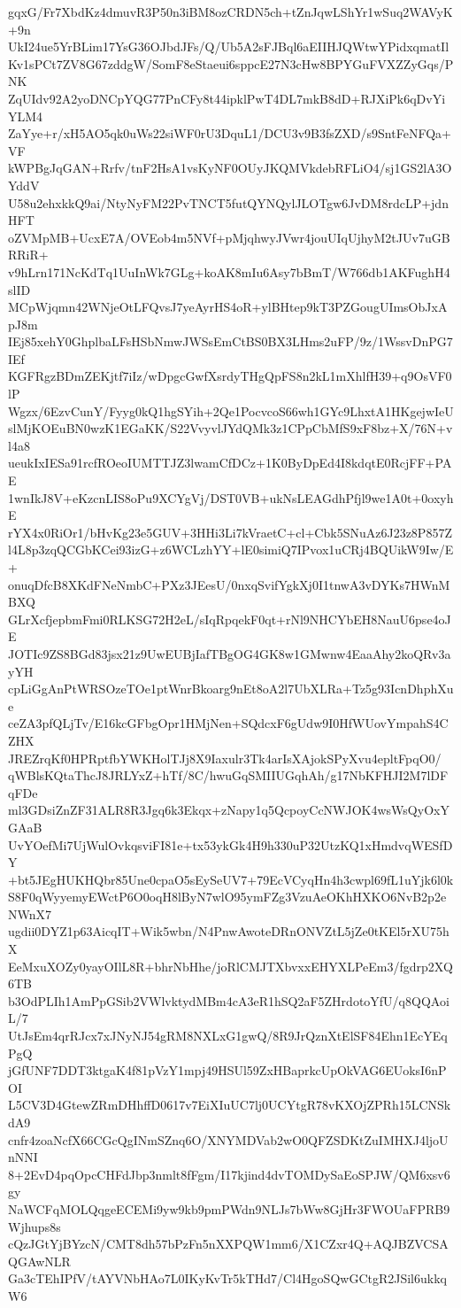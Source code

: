 gqxG/Fr7XbdKz4dmuvR3P50n3iBM8ozCRDN5ch+tZnJqwLShYr1wSuq2WAVyK+9n
UkI24ue5YrBLim17YsG36OJbdJFs/Q/Ub5A2sFJBql6aEIIHJQWtwYPidxqmatIl
Kv1sPCt7ZV8G67zddgW/SomF8eStaeui6sppcE27N3cHw8BPYGuFVXZZyGqs/PNK
ZqUIdv92A2yoDNCpYQG77PnCFy8t44ipklPwT4DL7mkB8dD+RJXiPk6qDvYiYLM4
ZaYye+r/xH5AO5qk0uWs22siWF0rU3DquL1/DCU3v9B3fsZXD/s9SntFeNFQa+VF
kWPBgJqGAN+Rrfv/tnF2HsA1vsKyNF0OUyJKQMVkdebRFLiO4/sj1GS2lA3OYddV
U58u2ehxkkQ9ai/NtyNyFM22PvTNCT5futQYNQylJLOTgw6JvDM8rdcLP+jdnHFT
oZVMpMB+UcxE7A/OVEob4m5NVf+pMjqhwyJVwr4jouUIqUjhyM2tJUv7uGBRRiR+
v9hLrn171NcKdTq1UuInWk7GLg+koAK8mIu6Asy7bBmT/W766db1AKFughH4slID
MCpWjqmn42WNjeOtLFQvsJ7yeAyrHS4oR+ylBHtep9kT3PZGougUImsObJxApJ8m
IEj85xehY0GhplbaLFsHSbNmwJWSsEmCtBS0BX3LHms2uFP/9z/1WssvDnPG7IEf
KGFRgzBDmZEKjtf7iIz/wDpgcGwfXsrdyTHgQpFS8n2kL1mXhlfH39+q9OsVF0lP
Wgzx/6EzvCunY/Fyyg0kQ1hgSYih+2Qe1PocvcoS66wh1GYc9LhxtA1HKgejwIeU
slMjKOEuBN0wzK1EGaKK/S22VvyvlJYdQMk3z1CPpCbMfS9xF8bz+X/76N+vl4a8
ueukIxIESa91rcfROeoIUMTTJZ3lwamCfDCz+1K0ByDpEd4I8kdqtE0RcjFF+PAE
1wnIkJ8V+eKzcnLIS8oPu9XCYgVj/DST0VB+ukNsLEAGdhPfjl9we1A0t+0oxyhE
rYX4x0RiOr1/bHvKg23e5GUV+3HHi3Li7kVraetC+cl+Cbk5SNuAz6J23z8P857Z
l4L8p3zqQCGbKCei93izG+z6WCLzhYY+lE0simiQ7IPvox1uCRj4BQUikW9Iw/E+
onuqDfcB8XKdFNeNmbC+PXz3JEesU/0nxqSvifYgkXj0I1tnwA3vDYKs7HWnMBXQ
GLrXcfjepbmFmi0RLKSG72H2eL/sIqRpqekF0qt+rNl9NHCYbEH8NauU6pse4oJE
JOTIc9ZS8BGd83jsx21z9UwEUBjIafTBgOG4GK8w1GMwnw4EaaAhy2koQRv3ayYH
cpLiGgAnPtWRSOzeTOe1ptWnrBkoarg9nEt8oA2l7UbXLRa+Tz5g93IcnDhphXue
ceZA3pfQLjTv/E16kcGFbgOpr1HMjNen+SQdcxF6gUdw9I0HfWUovYmpahS4CZHX
JREZrqKf0HPRptfbYWKHolTJj8X9Iaxulr3Tk4arIsXAjokSPyXvu4epltFpqO0/
qWBlsKQtaThcJ8JRLYxZ+hTf/8C/hwuGqSMIIUGqhAh/g17NbKFHJI2M7lDFqFDe
ml3GDsiZnZF31ALR8R3Jgq6k3Ekqx+zNapy1q5QcpoyCcNWJOK4wsWsQyOxYGAaB
UvYOefMi7UjWulOvkqsviFI81e+tx53ykGk4H9h330uP32UtzKQ1xHmdvqWESfDY
+bt5JEgHUKHQbr85Une0cpaO5sEySeUV7+79EcVCyqHn4h3cwpl69fL1uYjk6l0k
S8F0qWyyemyEWctP6O0oqH8lByN7wlO95ymFZg3VzuAeOKhHXKO6NvB2p2eNWnX7
ugdii0DYZ1p63AicqIT+Wik5wbn/N4PnwAwoteDRnONVZtL5jZe0tKEl5rXU75hX
EeMxuXOZy0yayOIlL8R+bhrNbHhe/joRlCMJTXbvxxEHYXLPeEm3/fgdrp2XQ6TB
b3OdPLIh1AmPpGSib2VWlvktydMBm4cA3eR1hSQ2aF5ZHrdotoYfU/q8QQAoiL/7
UtJsEm4qrRJcx7xJNyNJ54gRM8NXLxG1gwQ/8R9JrQznXtElSF84Ehn1EcYEqPgQ
jGfUNF7DDT3ktgaK4f81pVzY1mpj49HSUl59ZxHBaprkcUpOkVAG6EUoksI6nPOI
L5CV3D4GtewZRmDHhffD0617v7EiXIuUC7lj0UCYtgR78vKXOjZPRh15LCNSkdA9
cnfr4zoaNcfX66CGcQgINmSZnq6O/XNYMDVab2wO0QFZSDKtZuIMHXJ4ljoUnNNI
8+2EvD4pqOpcCHFdJbp3nmlt8fFgm/I17kjind4dvTOMDySaEoSPJW/QM6xsv6gy
NaWCFqMOLQqgeECEMi9yw9kb9pmPWdn9NLJs7bWw8GjHr3FWOUaFPRB9Wjhups8s
cQzJGtYjBYzcN/CMT8dh57bPzFn5nXXPQW1mm6/X1CZxr4Q+AQJBZVCSAQGAwNLR
Ga3cTEhIPfV/tAYVNbHAo7L0IKyKvTr5kTHd7/Cl4HgoSQwGCtgR2JSil6ukkqW6
